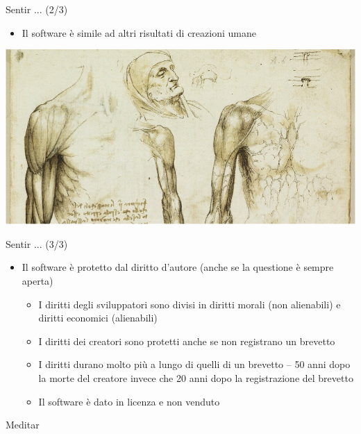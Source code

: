 \documentclass{beamer}
\begin{document}
\begin{frame}
{\centerline{Sentir ...  (2/3)}}
\begin{itemize}
    \item Il software \`{e} simile ad altri risultati di creazioni umane
\end{itemize} 
\begin{center}
    \includegraphics[width=\textwidth]{A2022.IDSEPC.ConcettoDiSoftware/SoftwareAttoCreativoLeonardo.jpg}
\end{center}

\end{frame}

\begin{frame}
{\centerline{Sentir ...   (3/3)}}
\begin{itemize}
    \item Il software \`{e} protetto dal diritto d'autore (anche se la questione \`{e} sempre aperta)
\begin{itemize}
    \item I diritti degli sviluppatori sono divisi in diritti morali (non alienabili) e diritti economici (alienabili)
    \item I diritti dei creatori sono protetti anche se non registrano un brevetto 
    \item I diritti durano molto pi\`{u} a lungo di quelli di un brevetto -- 50 anni dopo la morte del creatore invece che 20 anni dopo la registrazione del brevetto 
    \item Il software \`{e} dato in licenza e non venduto
\end{itemize} 
\end{itemize} 

\end{frame}

\begin{frame}
{\centerline{Meditar}}
\begin{center}
    
\end{center}

\end{frame}
\end{document}
